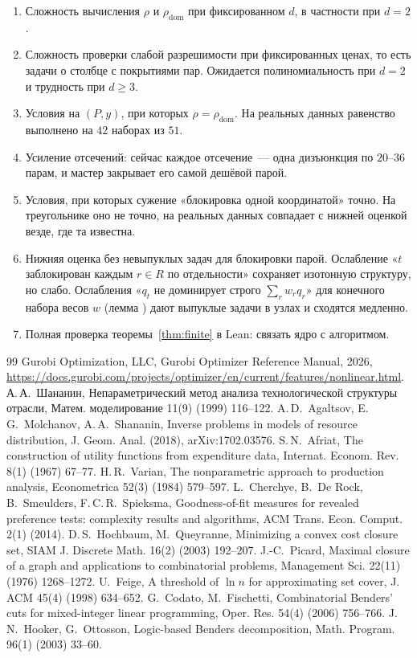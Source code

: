 \documentclass[a4paper,11pt]{article}
\newcommand{\lean}[1]{\mbox{\path{#1}}} %
\theoremstyle{plain}
\theoremstyle{definition}
\theoremstyle{remark}
\begin{document}
\begin{enumerate}
    \item Сложность вычисления $\rho$ и $\rho_{\mathrm{dom}}$ при фиксированном $d$, в частности при $d=2$.
    \item Сложность проверки слабой разрешимости при фиксированных ценах, то есть задачи о столбце с покрытиями пар. Ожидается полиномиальность при $d=2$ и трудность при $d\ge3$.
    \item Условия на $(P,y)$, при которых $\rho=\rho_{\mathrm{dom}}$. На реальных данных равенство выполнено на $42$ наборах из $51$.
    \item Усиление отсечений: сейчас каждое отсечение~--- одна дизъюнкция по $20$--$36$ парам, и мастер закрывает его самой дешёвой парой.
    \item Условия, при которых сужение «блокировка одной координатой» точно. На треугольнике оно не точно, на реальных данных совпадает с нижней оценкой везде, где та известна.
    \item Нижняя оценка без невыпуклых задач для блокировки парой. Ослабление «$t$ заблокирован каждым $r\in R$ по отдельности» сохраняет изотонную структуру, но слабо. Ослабления «$q_t$ не доминирует строго $\sum_rw_rq_r$» для конечного набора весов $w$ (лемма \lean{IsBlocked.exists_le_sum}) дают выпуклые задачи в узлах и сходятся медленно.
    \item Полная проверка теоремы~\ref{thm:finite} в Lean: связать ядро \lean{card_le_of_cut_sequence} с алгоритмом.
\end{enumerate}

\begin{thebibliography}{99}
 Gurobi Optimization, LLC, Gurobi Optimizer Reference Manual, 2026,
  \url{https://docs.gurobi.com/projects/optimizer/en/current/features/nonlinear.html}.
 А.\,А.~Шананин, Непараметрический метод анализа технологической структуры отрасли, Матем. моделирование 11(9) (1999) 116--122.
 A.\,D.~Agaltsov, E.\,G.~Molchanov, A.\,A.~Shananin, Inverse problems in models of resource distribution, J. Geom. Anal. (2018), arXiv:1702.03576.
 S.\,N.~Afriat, The construction of utility functions from expenditure data, Internat. Econom. Rev. 8(1) (1967) 67--77.
 H.\,R.~Varian, The nonparametric approach to production analysis, Econometrica 52(3) (1984) 579--597.
 L.~Cherchye, B.~De Rock, B.~Smeulders, F.\,C.\,R.~Spieksma, Goodness-of-fit measures for revealed preference tests: complexity results and algorithms, ACM Trans. Econ. Comput. 2(1) (2014).
 D.\,S.~Hochbaum, M.~Queyranne, Minimizing a convex cost closure set, SIAM J. Discrete Math. 16(2) (2003) 192--207.
 J.-C.~Picard, Maximal closure of a graph and applications to combinatorial problems, Management Sci. 22(11) (1976) 1268--1272.
 U.~Feige, A threshold of $\ln n$ for approximating set cover, J. ACM 45(4) (1998) 634--652.
 G.~Codato, M.~Fischetti, Combinatorial Benders' cuts for mixed-integer linear programming, Oper. Res. 54(4) (2006) 756--766.
 J.\,N.~Hooker, G.~Ottosson, Logic-based Benders decomposition, Math. Program. 96(1) (2003) 33--60.
\end{thebibliography}
\end{document}
